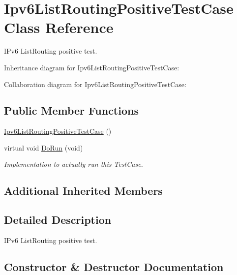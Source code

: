 \hypertarget{classIpv6ListRoutingPositiveTestCase}{}\section{Ipv6\+List\+Routing\+Positive\+Test\+Case Class Reference}
\label{classIpv6ListRoutingPositiveTestCase}


I\+Pv6 List\+Routing positive test.  




Inheritance diagram for Ipv6\+List\+Routing\+Positive\+Test\+Case\+:


Collaboration diagram for Ipv6\+List\+Routing\+Positive\+Test\+Case\+:
\subsection*{Public Member Functions}
\begin{DoxyCompactItemize}
\item 
\hyperlink{classIpv6ListRoutingPositiveTestCase_a8e3c5254a89977c21c114014b377158b}{Ipv6\+List\+Routing\+Positive\+Test\+Case} ()
\item 
virtual void \hyperlink{classIpv6ListRoutingPositiveTestCase_a146815e516bd42a6ba2a38ad5d12b686}{Do\+Run} (void)
\begin{DoxyCompactList}\small\item\em Implementation to actually run this Test\+Case. \end{DoxyCompactList}\end{DoxyCompactItemize}
\subsection*{Additional Inherited Members}


\subsection{Detailed Description}
I\+Pv6 List\+Routing positive test. 

\subsection{Constructor \& Destructor Documentation}
